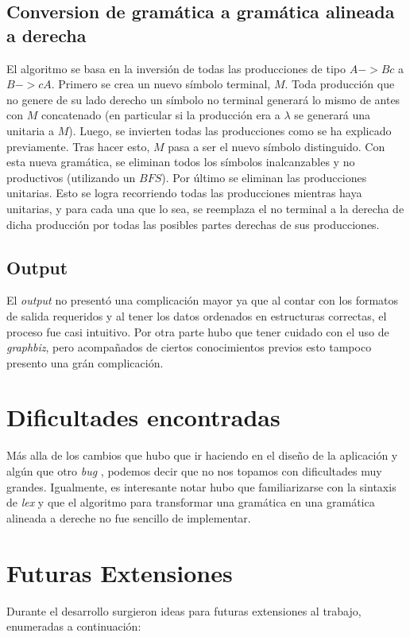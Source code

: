 \documentclass[a4paper,10pt]{article}
\begin{document}
      \subsection{Conversion de gramática a gramática alineada a derecha}
            El algoritmo se basa  en la inversión de todas las producciones de tipo $A->Bc$  a  $B->cA$. Primero se crea un nuevo símbolo terminal, $M$.
Toda producción que no genere de su lado derecho un símbolo no terminal generará lo mismo de antes con $M$ concatenado (en particular si la producción era 
a $\lambda$ se generará una unitaria a $M$). Luego, se invierten todas las producciones como se ha explicado previamente. Tras hacer esto, $M$ pasa a ser el 
nuevo símbolo distinguido. Con esta nueva gramática, se eliminan todos los símbolos inalcanzables y no productivos (utilizando un $BFS$). Por último se 
eliminan las producciones unitarias. Esto se logra recorriendo todas las producciones mientras haya unitarias, y para cada una que lo sea, se reemplaza 
el no terminal a la derecha de dicha producción por todas las posibles partes derechas de sus producciones. 
      \subsection{Output}
            El \textit{output} no presentó una complicación mayor ya que al contar con los formatos de salida 
            requeridos y al tener los datos ordenados en estructuras correctas, el proceso fue casi intuitivo.
            Por otra parte hubo que tener cuidado con el uso de \textit{graphbiz}, pero acompañados de ciertos
            conocimientos previos esto tampoco presento una grán complicación.

\newpage

\section{Dificultades encontradas}
    Más alla de los cambios que hubo que ir haciendo en el diseño de la aplicación y algún que otro \textit{bug} 
    , podemos decir que no nos topamos con dificultades muy grandes. Igualmente, es interesante notar hubo que 
    familiarizarse con la sintaxis de \textit{lex} y que el algoritmo para transformar una gramática en una 
    gramática alineada a dereche no fue sencillo de implementar.
\newpage

\section{Futuras Extensiones}
    Durante el desarrollo surgieron ideas para futuras extensiones al trabajo, enumeradas a continuación:
\end{document}
